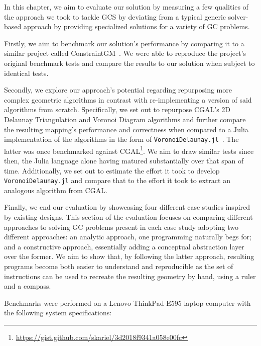 %
\label{chap:eval}
\cleardoublepage{}

\noindent In this chapter, we aim to evaluate our solution by measuring a few
qualities of the approach we took to tackle \ac{GCS} by deviating from a typical
generic solver-based approach by providing specialized solutions for a variety
of \ac{GC} problems.

Firstly, we aim to benchmark our solution's performance by comparing it to a
similar project called ConstraintGM~\cite{Pinheiro:2016:MGR}.  We were able to
reproduce the project's original benchmark tests and compare the results to our
solution when subject to identical tests.

Secondly, we explore our approach's potential regarding repurposing more complex
geometric algorithms in contrast with re-implementing a version of said
algorithms from scratch.  Specifically, we set out to repurpose \ac{CGAL}'s 2D
Delaunay Triangulation and Voronoi Diagram algorithms and further compare the
resulting mapping's performance and correctness when compared to a Julia
implementation of the algorithms in the form of
\texttt{VoronoiDelaunay.jl}~\cite{Keselman:2014:VoronoiDelaunay.jl}.  The latter
was once benchmarked against
\ac{CGAL}\footnote{\url{https://gist.github.com/skariel/3d2018f9341a058e00fc}}.
We aim to draw similar tests since then, the Julia language alone having matured
substantially over that span of time.  Additionally, we set out to estimate the
effort it took to develop \texttt{VoronoiDelaunay.jl} and compare that to the
effort it took to extract an analogous algorithm from \ac{CGAL}.

Finally, we end our evaluation by showcasing four different case studies
inspired by existing designs.  This section of the evaluation focuses on
comparing different approaches to solving \ac{GC} problems present in each case
study adopting two different approaches: an analytic approach, one programming
naturally begs for; and a constructive approach, essentially adding a conceptual
abstraction layer over the former.  We aim to show that, by following the latter
approach, resulting programs become both easier to understand and reproducible
as the set of instructions can be used to recreate the resulting geometry by
hand, using a ruler and a compass.

Benchmarks were performed on a Lenovo ThinkPad E595 laptop computer with the
following system specifications:

